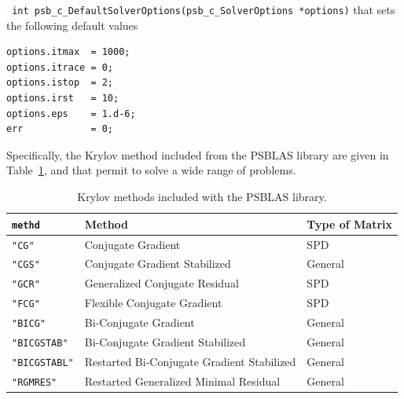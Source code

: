 \documentclass[twoside,a4paper]{refart}
\newenvironment{fulltable}[1][tbp]
{\begin{table}[#1]%
		\hspace*{-\leftmarginwidth}%
		\begin{minipage}{\fullwidth}}
		{\end{minipage}\end{table}}
\theoremstyle{definition}
\begin{document}
 \lstinline[style=CStyle]| int psb_c_DefaultSolverOptions(psb_c_SolverOptions *options)|
that sets the following default values
\begin{lstlisting}[style=CStyle]
options.itmax  = 1000;
options.itrace = 0;
options.istop  = 2;
options.irst   = 10;
options.eps    = 1.d-6;
err            = 0;
\end{lstlisting}

Specifically, the Krylov method included from the PSBLAS library are given in Table~\ref{tab:krylov_methods}, and that permit to solve a wide range of problems.
\begin{fulltable}[htbp]
\centering
\begin{tabular}{lll}
\toprule
\lstinline[style=CStyle]|methd| & Method & Type of Matrix \\
\midrule
\lstinline[style=CStyle]|"CG"| & Conjugate Gradient & SPD \\
\lstinline[style=CStyle]|"CGS"| & Conjugate Gradient Stabilized  & General \\
\lstinline[style=CStyle]|"GCR"| & Generalized Conjugate Residual  & SPD  \\
\lstinline[style=CStyle]|"FCG"| & Flexible Conjugate Gradient  & SPD  \\
\lstinline[style=CStyle]|"BICG"| & Bi-Conjugate Gradient & General \\
\lstinline[style=CStyle]|"BICGSTAB"| & Bi-Conjugate Gradient Stabilized & General \\
\lstinline[style=CStyle]|"BICGSTABL"| & Restarted Bi-Conjugate Gradient Stabilized& General \\
\lstinline[style=CStyle]|"RGMRES"| & Restarted Generalized Minimal Residual & General \\
\bottomrule
\end{tabular}
	\caption{Krylov methods included with the PSBLAS library.}\label{tab:krylov_methods}
\end{fulltable}
\end{document}
